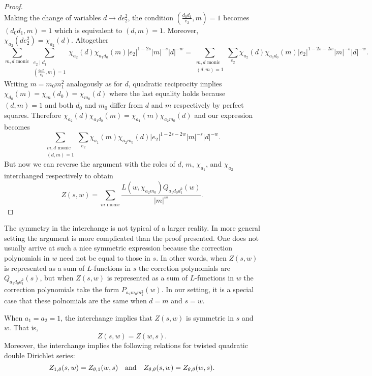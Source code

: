 \documentclass[12pt,reqno,oneside]{amsart}
\begin{document}
\begin{proof}
\[        \]
        Making the change of variables $d \to de_{2}^{2}$, the condition $\left(\frac{d_{0}d_{1}}{e_{2}},m\right) = 1$ becomes $(d_{0}d_{1},m) = 1$ which is equivalent to $(d,m) = 1$. Moreover, $\chi_{a_{2}}(de_{2}^{2}) = \chi_{a_{2}}(d)$. Altogether 
        \[
            \sum_{\text{$m,d$ monic}}\sum_{\substack{e_{2} \mid d_{1} \\ \left(\frac{d_{0}d_{1}}{e_{2}},m\right) = 1}}\chi_{a_{2}}(d)\chi_{a_{1}d_{0}}(m)|e_{2}|^{1-2s}|m|^{-s}|d|^{-w} = \sum_{\substack{\text{$m,d$ monic} \\ (d,m) = 1}}\sum_{e_{2}}\chi_{a_{2}}(d)\chi_{a_{1}d_{0}}(m)|e_{2}|^{1-2s-2w}|m|^{-s}|d|^{-w}.
        \]
        Writing $m = m_{0}m_{1}^{2}$ analogously as for $d$, quadratic reciprocity implies $\chi_{d_{0}}(m) = \chi_{m}(d_{0}) = \chi_{m_{0}}(d)$ where the last equality holds because $(d,m) = 1$ and both $d_{0}$ and $m_{0}$ differ from $d$ and $m$ respectively by perfect squares. Therefore $\chi_{a_{2}}(d)\chi_{a_{1}d_{0}}(m) = \chi_{a_{1}}(m)\chi_{a_{2}m_{0}}(d)$ and our expression becomes
        \[
            \sum_{\substack{\text{$m,d$ monic} \\ (d,m) = 1}}\sum_{e_{2}}\chi_{a_{1}}(m)\chi_{a_{2}m_{0}}(d)|e_{2}|^{1-2s-2w}|m|^{-s}|d|^{-w}.
        \]
        But now we can reverse the argument with the roles of $d$, $m$, $\chi_{a_{1}}$, and $\chi_{a_{2}}$ interchanged respectively to obtain
        \[
            Z(s,w) = \sum_{\text{$m$ monic}}\frac{L(w,\chi_{a_{2}m_{0}})Q_{a_{1}d_{0}d_{1}^{2}}(w)}{|m|^{w}}.
        \]
    \end{proof}

    The symmetry in the interchange is not typical of a larger reality. In more general setting the argument is more complicated than the proof presented. One does not usually arrive at such a nice symmetric expression because the correction polynomials in $w$ need not be equal to those in $s$. In other words, when $Z(s,w)$ is represented as a sum of $L$-functions in $s$ the corretion polynomials are $Q_{a_{1}d_{0}d_{1}^{2}}(s)$, but when $Z(s,w)$ is represented as a sum of $L$-functions in $w$ the correction polynomials take the form $P_{a_{2}m_{0}m_{1}^{2}}(w)$. In our setting, it is a special case that these polnomials are the same when $d = m$ and $s = w$.

    \begin{remark}\label{rem:symmetry_of_Double_Dirichlet_series}
        When $a_{1} = a_{2} = 1$, the interchange implies that $Z(s,w)$ is symmetric in $s$ and $w$. That is,
        \[
            Z(s,w) = Z(w,s).
        \]
        Moreover, the interchange implies the following relations for twisted quadratic double Dirichlet series:
        \[
            Z_{1,\theta}(s,w) = Z_{\theta,1}(w,s) \quad \text{and} \quad Z_{\theta,\theta}(s,w) = Z_{\theta,\theta}(w,s).
        \]
    \end{remark}
\end{document}

